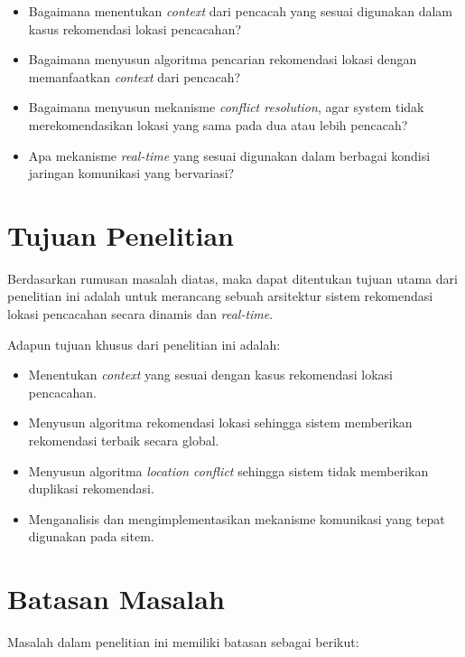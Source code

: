 \begin{itemize}
\item Bagaimana menentukan \textit{context} dari pencacah yang sesuai digunakan dalam kasus rekomendasi lokasi pencacahan?
\item Bagaimana menyusun algoritma pencarian rekomendasi lokasi dengan memanfaatkan \textit{context} dari pencacah?
\item Bagaimana menyusun mekanisme \textit{conflict resolution}, agar system tidak merekomendasikan lokasi yang sama pada dua atau lebih pencacah?
\item Apa mekanisme \textit{real-time} yang sesuai digunakan dalam berbagai kondisi jaringan komunikasi yang bervariasi?
\end{itemize}


\section{Tujuan Penelitian}
Berdasarkan rumusan masalah diatas, maka dapat ditentukan tujuan utama dari penelitian ini adalah untuk merancang sebuah arsitektur sistem rekomendasi lokasi pencacahan secara dinamis dan \textit{real-time}. 

Adapun tujuan khusus dari penelitian ini adalah:

\begin{itemize}
\item Menentukan \textit{context} yang sesuai dengan kasus rekomendasi lokasi pencacahan.
\item Menyusun algoritma rekomendasi lokasi sehingga sistem memberikan rekomendasi terbaik secara global.
\item Menyusun algoritma \textit{location conflict} sehingga sistem tidak memberikan duplikasi rekomendasi.
\item Menganalisis dan mengimplementasikan mekanisme komunikasi yang tepat digunakan pada sitem.
\end{itemize}


\section{Batasan Masalah}
Masalah dalam penelitian ini memiliki batasan sebagai berikut:

